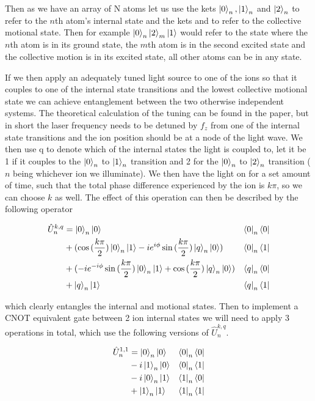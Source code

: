 Then as we have an array of N atoms let us use the kets $\ket{0}_n, \ket{1}_n$ and $\ket{2}_n$ to refer to the $n$th atom's internal state and the kets \kz and \ko to refer to the collective motional state.
Then for example $\ket{0}_n\ket{2}_m\ket{1}$ would refer to the state where the $n$th atom is in its ground state, the $m$th atom is in the second excited state and the collective motion is in its excited state, all other atoms can be in any state.

If we then apply an adequately tuned light source to one of the ions so that it couples to one of the internal state transitions and the lowest collective motional state we can achieve entanglement between the two otherwise independent systems.
The theoretical calculation of the tuning can be found in the paper, but in short the laser frequency needs to be detuned by $f_z$ from one of the internal state transitions and the ion position should be at a node of the light wave.
We then use q to denote which of the internal states the light is coupled to, let it be 1 if it couples to the $\ket{0}_n$ to $\ket{1}_n$ transition and 2 for the $\ket{0}_n$ to $\ket{2}_n$ transition ($n$ being whichever ion we illuminate).
We then have the light on for a set amount of time, such that the total phase difference experienced by the ion is $k \pi$, so we can choose $k$ as well.
The effect of this operation can then be described by the following operator

\newcommand{\bigfrac}{(\frac{k\pi}{2})}
\begin{equation}
    \begin{aligned}
        \hat{U}^{k,q}_n &= \ket{0}_n\ket{0}&\bra{0}_n\bra{0} \\
        &+ (\cos{\bigfrac}\ket{0}_n\ket{1} -i e^{i\phi} \sin{\bigfrac}\ket{q}_n\ket{0})&\bra{0}_n\bra{1} \\
        &+ (-i e^{-i\phi} \sin{\bigfrac}\ket{0}_n\ket{1} + \cos{\bigfrac}\ket{q}_n\ket{0})&\bra{q}_n\bra{0} \\
        &+ \ket{q}_n\ket{1}&\bra{q}_n\bra{1}
    \end{aligned}
\end{equation}

which clearly entangles the internal and motional states.
Then to implement a CNOT equivalent gate between 2 ion internal states we will need to apply 3 operations in total, which use the following versions of $\hat{U}^{k,q}_n$.

\begin{equation}
    \begin{aligned}
        \hat{U}^{1,1}_n &= \ket{0}_n\ket{0}&\bra{0}_n\bra{0} \\
        &-i \ket{1}_n\ket{0}&\bra{0}_n\bra{1} \\
        &-i \ket{0}_n\ket{1}&\bra{1}_n\bra{0} \\
        &+ \ket{1}_n\ket{1}&\bra{1}_n\bra{1}
    \end{aligned}
\end{equation}

